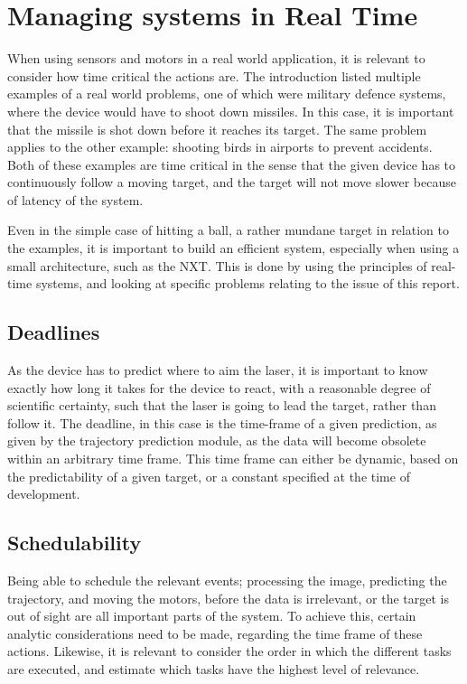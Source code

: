 
\section{Managing systems in Real Time} 
When using sensors and motors in a real world application, it is relevant to consider how time critical the actions are.
The introduction listed multiple examples of a real world problems, one of which were military defence systems, where the device would have to shoot down missiles.
In this case, it is important that the missile is shot down before it reaches its target.
The same problem applies to the other example: shooting birds in airports to prevent accidents.
Both of these examples are time critical in the sense that the given device has to continuously follow a moving target, and the target will not move slower because of latency of the system.

Even in the simple case of hitting a ball, a rather mundane target in relation to the examples, it is important to build an efficient system, especially when using a small architecture, such as the NXT.
This is done by using the principles of real-time systems, and looking at specific problems relating to the issue of this report.

\subsection{Deadlines}
As the device has to predict where to aim the laser, it is important to know exactly how long it takes for the device to react, with a reasonable degree of scientific certainty, such that the laser is going to lead the target, rather than follow it. 
The deadline, in this case is the time-frame of a given prediction, as given by the trajectory prediction module, as the data will become obsolete within an arbitrary time frame.
This time frame can either be dynamic, based on the predictability of a given target, or a constant specified at the time of development.

\subsection{Schedulability}
Being able to schedule the relevant events; processing the image, predicting the trajectory, and moving the motors, before the data is irrelevant, or the target is out of sight are all important parts of the system.
To achieve this, certain analytic considerations need to be made, regarding the time frame of these actions. 
Likewise, it is relevant to consider the order in which the different tasks are executed, and estimate which tasks have the highest level of relevance.

